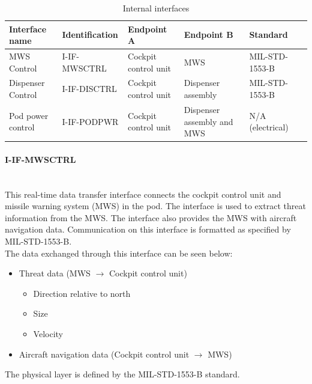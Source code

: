  \begin{table}[h]
 \centering
 \caption{Internal interfaces}
 \label{tab:internal}
  \begin{tabular}{ | p{2cm} | l | p{2.3cm} | p{2.3cm} | l | p{1cm} |}
  \hline
   \textbf{Interface name} & \textbf{Identification} & \textbf{Endpoint A} & \textbf{Endpoint B} & \textbf{Standard}\\ \hline
 MWS Control & I-IF-MWSCTRL & Cockpit control unit & MWS & MIL-STD-1553-B\\ \hline
 Dispenser Control & I-IF-DISCTRL & Cockpit control unit & Dispenser assembly & MIL-STD-1553-B\\ \hline
Pod power control & I-IF-PODPWR & Cockpit control unit & Dispenser assembly and MWS & N/A (electrical)\\ \hline
  \end{tabular}
  \end{table}
  
\paragraph{I-IF-MWSCTRL}\mbox{}\\
This real-time data transfer interface connects the cockpit control unit and missile warning system (MWS) in the pod. The interface is used to extract threat information from the MWS. The interface also provides the MWS with aircraft navigation data.
Communication on this interface is formatted as specified by MIL-STD-1553-B.
  \\
The data exchanged through this interface can be seen below:
  \begin{itemize}
  \item Threat data (MWS $\rightarrow$ Cockpit control unit)
	\begin{itemize}  	
  	\item Direction relative to north
  	\item Size
  	\item Velocity
  	\end{itemize}
  \item Aircraft navigation data (Cockpit control unit $\rightarrow$ MWS)
  
  \end{itemize}
  The physical layer is defined by the MIL-STD-1553-B standard.
  
